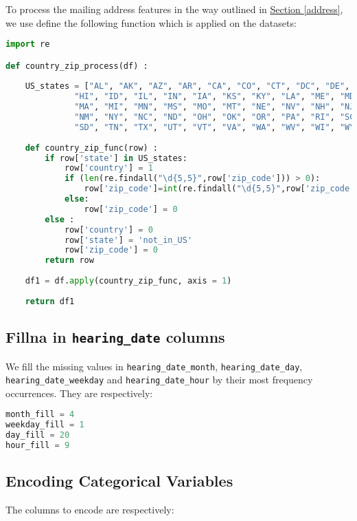 \documentclass[12pt,letterpaper]{article}
\numberwithin{equation}{section}
\begin{document}
To process the mailing address features in the way outlined in \hyperref[address]{Section \ref*{address}}, we use define the following function which is applied on the datasets:

\begin{lstlisting}[language=Python, basicstyle=\footnotesize]
import re

def country_zip_process(df) :
    
    US_states = ["AL", "AK", "AZ", "AR", "CA", "CO", "CT", "DC", "DE", "FL", "GA", 
              "HI", "ID", "IL", "IN", "IA", "KS", "KY", "LA", "ME", "MD", 
              "MA", "MI", "MN", "MS", "MO", "MT", "NE", "NV", "NH", "NJ", 
              "NM", "NY", "NC", "ND", "OH", "OK", "OR", "PA", "RI", "SC", 
              "SD", "TN", "TX", "UT", "VT", "VA", "WA", "WV", "WI", "WY"]
    
    def country_zip_func(row) : 
        if row['state'] in US_states: 
            row['country'] = 1
            if (len(re.findall("\d{5,5}",row['zip_code'])) > 0):
                row['zip_code']=int(re.findall("\d{5,5}",row['zip_code'])[0])
            else:
                row['zip_code'] = 0
        else : 
            row['country'] = 0
            row['state'] = 'not_in_US'
            row['zip_code'] = 0
        return row
    
    df1 = df.apply(country_zip_func, axis = 1)
    
    return df1
\end{lstlisting}

\subsection{Fillna in \texttt{hearing\_date} columns}

We fill the missing values in \verb|hearing_date_month|, \verb|hearing_date_day|, \verb|hearing_date_weekday| and \verb|hearing_date_hour| by their most frequency occurrences. They are respectively: 
\begin{lstlisting}[language=Python, basicstyle=\footnotesize]
month_fill = 4
weekday_fill = 1
day_fill = 20
hour_fill = 9
\end{lstlisting}


\subsection{Encoding Categorical Variables}

The columns to encode are respectively:
\end{document}
